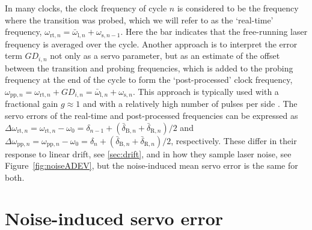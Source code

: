 \documentclass[10pt,a4paper]{iopart}
\begin{document}
In many clocks, the clock frequency of cycle $n$ is considered to be the frequency where the transition was probed, which we will refer to as the `real-time' frequency,
$\omega_{\mathrm{rt},n} = \bar{\omega}_{\mathrm{l},n} + \omega_{\mathrm{s},n-1}$. Here the bar indicates that the free-running laser frequency is averaged over the cycle.
Another approach is to interpret the error term $GD_{i,n}$ not only as a servo parameter, but as an estimate of the offset between the transition and probing frequencies, which is added to the probing frequency at the end of the cycle to form the `post-processed' clock frequency, $\omega_{\mathrm{pp},n} = \omega_{\mathrm{rt},n} + GD_{i,n} = \bar{\omega}_{\mathrm{l},n} + \omega_{\mathrm{s},n}$. This approach is typically used with a fractional gain $g\approx 1$ and with a relatively high number of pulses per side \cite{Dube2015a}.
The servo errors of the real-time and post-processed frequencies can be expressed as $\Delta\omega_{\mathrm{rt},n} = \omega_{\mathrm{rt},n} - \omega_0 = \delta_{n-1} + (\bar{\delta}_{\mathrm{B},n} + \bar{\delta}_{\mathrm{R},n})/2$ and $\Delta\omega_{\mathrm{pp},n} = \omega_{\mathrm{pp},n} - \omega_0 = \delta_n + (\bar{\delta}_{\mathrm{B},n} + \bar{\delta}_{\mathrm{R},n})/2$, respectively. These differ in their response to linear drift, see \ref{sec:drift}, and in how they sample laser noise, see Figure~\ref{fig:noiseADEV}, but the noise-induced mean servo error is the same for both.


\section{Noise-induced servo error \label{sec:se}}
\end{document}
